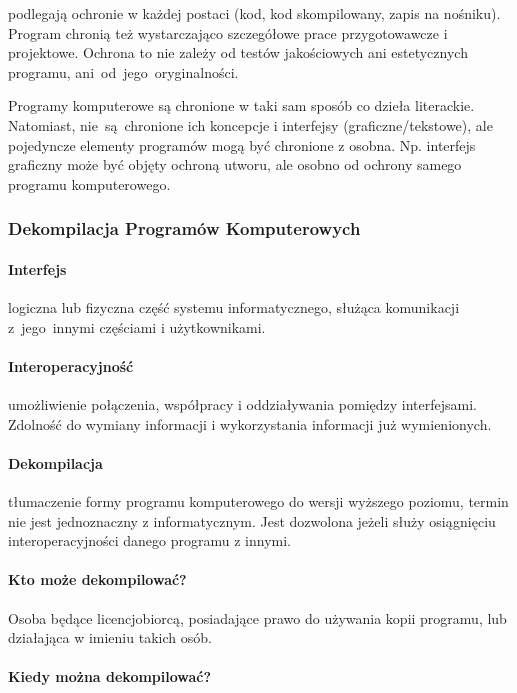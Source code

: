 \documentclass{article}
\begin{document}
podlegają ochronie w każdej postaci (kod, kod skompilowany, zapis na nośniku).
Program chronią też wystarczająco szczegółowe prace przygotowawcze i projektowe.
Ochrona to nie zależy od testów jakościowych ani estetycznych programu, ani~od~jego~oryginalności.

Programy komputerowe są chronione w taki sam sposób co dzieła literackie.
Natomiast, nie~są~chronione ich koncepcje i interfejsy (graficzne/tekstowe), ale pojedyncze elementy programów mogą być chronione z osobna.
Np. interfejs graficzny może być objęty ochroną utworu, ale osobno od ochrony samego programu komputerowego.

\subsubsection{Dekompilacja Programów Komputerowych}

\paragraph{Interfejs}

logiczna lub fizyczna część systemu informatycznego, służąca komunikacji z~jego~innymi częściami i użytkownikami.

\paragraph{Interoperacyjność}

umożliwienie połączenia, współpracy i oddziaływania pomiędzy interfejsami.
Zdolność do wymiany informacji i wykorzystania informacji już wymienionych.

\paragraph{Dekompilacja}

tłumaczenie formy programu komputerowego do wersji wyższego poziomu, termin nie jest jednoznaczny z informatycznym. Jest dozwolona jeżeli służy osiągnięciu interoperacyjności danego programu z innymi.

\paragraph{Kto może dekompilować?}

Osoba będące licencjobiorcą, posiadające prawo do używania kopii programu, lub działająca w imieniu takich osób.

\paragraph{Kiedy można dekompilować?}
\end{document}
